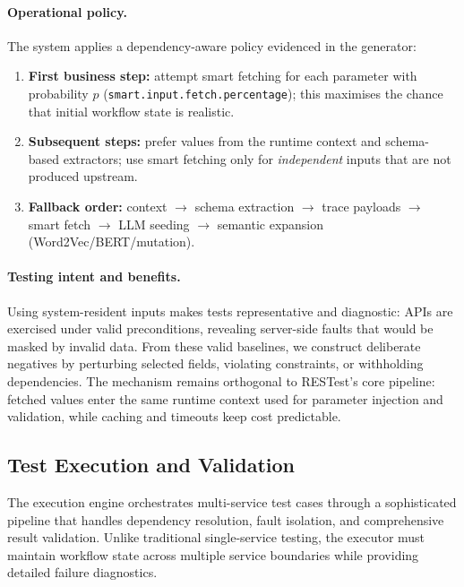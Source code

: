\documentclass[conference]{IEEEtran}
\begin{document}
\paragraph{Operational policy.}
The system applies a dependency-aware policy evidenced in the generator:
\begin{enumerate}[leftmargin=*]
  \item \textbf{First business step:} attempt smart fetching for each parameter with probability \(p\) (\texttt{smart.input.fetch.percentage}); this maximises the chance that initial workflow state is realistic.
  \item \textbf{Subsequent steps:} prefer values from the runtime context and schema-based extractors; use smart fetching only for \emph{independent} inputs that are not produced upstream.
  \item \textbf{Fallback order:} context \(\rightarrow\) schema extraction \(\rightarrow\) trace payloads \(\rightarrow\) smart fetch \(\rightarrow\) LLM seeding \(\rightarrow\) semantic expansion (Word2Vec/BERT/mutation).
\end{enumerate}

\paragraph{Testing intent and benefits.}
Using system-resident inputs makes tests representative and diagnostic: APIs are exercised under valid preconditions, revealing server-side faults that would be masked by invalid data. From these valid baselines, we construct deliberate negatives by perturbing selected fields, violating constraints, or withholding dependencies. The mechanism remains orthogonal to RESTest’s core pipeline: fetched values enter the same runtime context used for parameter injection and validation, while caching and timeouts keep cost predictable.


\subsection{Test Execution and Validation}
\label{ssec:exec}

The execution engine orchestrates multi-service test cases through a
sophisticated pipeline that handles dependency resolution, fault isolation,
and comprehensive result validation.  Unlike traditional single-service
testing, the executor must maintain workflow state across multiple service
boundaries while providing detailed failure diagnostics.
\end{document}

